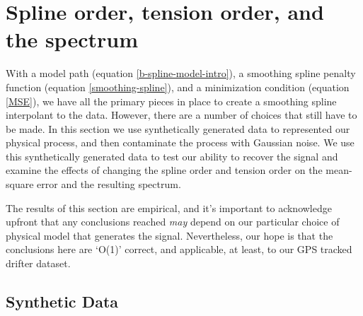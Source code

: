 \documentclass[10pt,journal]{IEEEtran}
\begin{document}

%
\section{Spline order, tension order, and the spectrum} \label{sec:optimal_parameter}
%

With a model path (equation \ref{b-spline-model-intro}), a smoothing spline penalty function (equation \ref{smoothing-spline}), and a minimization condition (equation \ref{MSE}), we have all the primary pieces in place to create a smoothing spline interpolant to the data. However, there are a number of choices that still have to be made. In this section we use synthetically generated data to represented our physical process, and then contaminate the process with Gaussian noise. We use this synthetically generated data to test our ability to recover the signal and examine the effects of changing the spline order and tension order on the mean-square error and the resulting spectrum.

The results of this section are empirical, and it's important to acknowledge upfront that any conclusions reached \emph{may} depend on our particular choice of physical model that generates the signal. Nevertheless, our hope is that the conclusions here are `O(1)' correct, and applicable, at least, to our GPS tracked drifter dataset.

\subsection{Synthetic Data} \label{sec:synthetic_data}
\end{document}
